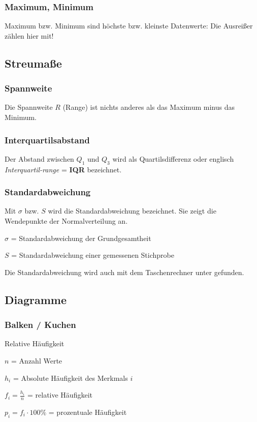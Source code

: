 \begin{multicols}{2}
\subsubsection{Maximum, Minimum}
Maximum bzw. Minimum sind höchste bzw. kleinste Datenwerte: Die Ausreißer
zählen hier mit!

\subsection{Streumaße}
\subsubsection{Spannweite}
Die Spannweite $R$ (Range) ist nichts anderes als das Maximum minus
das Minimum.

\subsubsection{Interquartilsabstand}
Der Abstand zwischen $Q_1$ und $Q_3$ wird als Quartilsdifferenz oder
englisch \textit{Interquartil-range} = \textbf{IQR} bezeichnet.

\subsubsection{Standardabweichung}
Mit $\sigma$ bzw. $S$ wird die Standardabweichung bezeichnet. Sie
zeigt die Wendepunkte der Normalverteilung an.

$\sigma$ = Standardabweichung der Grundgesamtheit

$S$ = Standardabweichung einer gemessenen Stichprobe

Die Standardabweichung wird auch mit dem Taschenrechner
unter  gefunden.

\subsection{Diagramme}
\subsubsection{Balken / Kuchen}
\begin{definition}{Relative Häufigkeit}{}

$n$ = Anzahl Werte

$h_i$ = Absolute Häufigkeit des Merkmals $i$

$f_i = \frac{h_i}n$ = relative Häufigkeit

$p_i = f_i\cdot{}100\%$ = prozentuale Häufigkeit


\end{definition}
\end{multicols}
